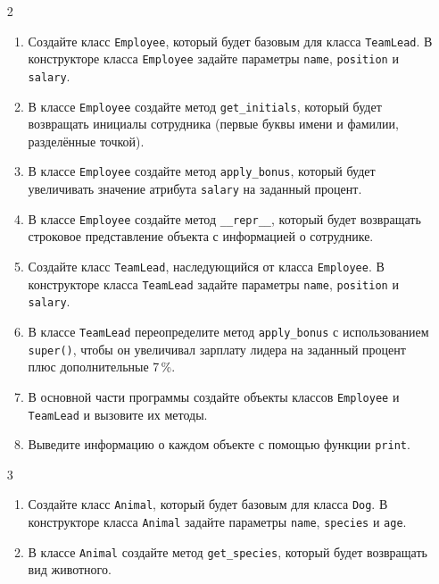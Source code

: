 \begin{enumerate}
\item[2] 
\begin{enumerate}[leftmargin=*]
    \item Создайте класс \texttt{Employee}, который будет базовым для класса \texttt{TeamLead}. В конструкторе класса \texttt{Employee} задайте параметры \texttt{name}, \texttt{position} и \texttt{salary}.
    
    \item В классе \texttt{Employee} создайте метод \texttt{get\_initials}, который будет возвращать инициалы сотрудника (первые буквы имени и фамилии, разделённые точкой).
    
    \item В классе \texttt{Employee} создайте метод \texttt{apply\_bonus}, который будет увеличивать значение атрибута \texttt{salary} на заданный процент.
    
    \item В классе \texttt{Employee} создайте метод \texttt{\_\_repr\_\_}, который будет возвращать строковое представление объекта с информацией о сотруднике.
    
    \item Создайте класс \texttt{TeamLead}, наследующийся от класса \texttt{Employee}. В конструкторе класса \texttt{TeamLead} задайте параметры \texttt{name}, \texttt{position} и \texttt{salary}.
    
    \item В классе \texttt{TeamLead} переопределите метод \texttt{apply\_bonus} с использованием \texttt{super()}, чтобы он увеличивал зарплату лидера на заданный процент плюс дополнительные 7\,\%.
    
    \item В основной части программы создайте объекты классов \texttt{Employee} и \texttt{TeamLead} и вызовите их методы.
    
    \item Выведите информацию о каждом объекте с помощью функции \texttt{print}.
\end{enumerate}

\item[3] 
\begin{enumerate}[leftmargin=*]
    \item Создайте класс \texttt{Animal}, который будет базовым для класса \texttt{Dog}. В конструкторе класса \texttt{Animal} задайте параметры \texttt{name}, \texttt{species} и \texttt{age}.
    
    \item В классе \texttt{Animal} создайте метод \texttt{get\_species}, который будет возвращать вид животного.
    

\end{enumerate}
\end{enumerate}
